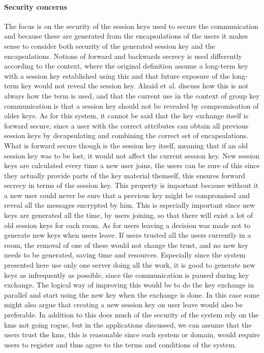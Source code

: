\paragraph{Security concerns}
The focus is on the security of the session keys used to secure the communication and because these are generated from the encapsulations of the users it makes sense to consider both security of the generated session key and the encapsulations. Notions of forward and backwards secrecy is used differently according to the context, where the original definition assume a long-term key with a session key established using this and that future exposure of the long-term key would not reveal the session key. Alzaid et al. \cite{Alzaid2010} discuss how this is not always how the term is used, and that the current use in the context of group key communication is that a session key should not be revealed by compromisation of older keys. As for this system, it cannot be said that the key exchange itself is forward secure, since a user with the correct attributes can obtain all previous session keys by decapsulating and combining the correct set of encapsulations. What is forward secure though is the session key itself, meaning that if an old session key was to be lost, it would not affect the current session key. New session keys are calculated every time a new user joins, the users can be sure of this since they actually provide parts of the key material themself, this ensures forward secrecy in terms of the session key. This property is important because without it a new user could never be sure that a previous key might be compromised and reveal all the messages encrypted by him. This is especially important since new keys are generated all the time, by users joining, so that there will exist a lot of old session keys for each room. As for users leaving a decision was made not to generate new keys when users leave. If users trusted all the users currently in a room, the removal of one of these would not change the trust, and no new key needs to be generated, saving time and resources. Especially since the system presented here use only one server doing all the work, it is good to generate new keys as infrequently as possible, since the communication is paused during key exchange. The logical way of improving this would be to do the key exchange in parallel and start using the new key when the exchange is done. In this case some might also argue that creating a new session key on user leave would also be preferable.
In addition to this does much of the security of the system rely on the \gls{kms} not going rogue, but in the applications discussed, we can assume that the users trust the \gls{kms}, this is reasonable since each system or domain, would require users to register and thus agree to the terms and conditions of the system.



